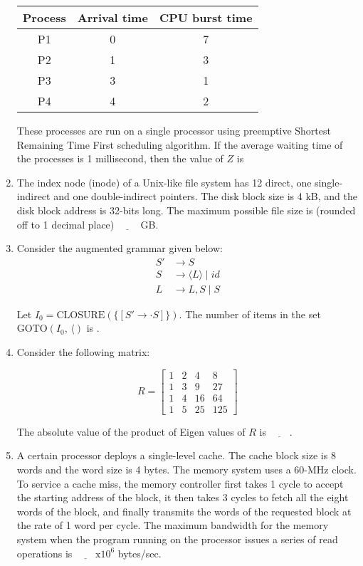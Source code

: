\documentclass[12pt]{article}
\begin{document}
\begin{enumerate}[label=Q.\arabic*]
\begin{center}
\begin{tabular}{|c|c|c|}
\hline
Process & Arrival time & CPU burst time \\
\hline
P1 & 0 & 7 \\
P2 & 1 & 3 \\
P3 & 3 & 1 \\
P4 & 4 & 2 \\
\hline
\end{tabular}
\end{center}

These processes are run on a single processor using preemptive Shortest Remaining Time First scheduling algorithm. If the average waiting time of the processes is 1 millisecond, then the value of $Z$ is \underline{\hspace{2cm}}


\item The index node (inode) of a Unix-like file system has 12 direct, one single-indirect and one double-indirect pointers. The disk block size is 4 kB, and the disk block address is 32-bits long. The maximum possible file size is (rounded off to 1 decimal place) $\underline{\quad\quad}$ GB.

\item Consider the augmented grammar given below:
\begin{align*}
S' &\rightarrow S \\
S &\rightarrow \langle L \rangle \mid id \\
L &\rightarrow L, S \mid S
\end{align*}

Let $I_0 = \text{CLOSURE}(\{[S' \rightarrow \cdot S]\})$. The number of items in the set $\text{GOTO}(I_0,\, \langle)$ is \underline{\quad\quad}.


\item Consider the following matrix:

\[
R = \begin{bmatrix}
1 & 2 & 4 & 8 \\
1 & 3 & 9 & 27 \\
1 & 4 & 16 & 64 \\
1 & 5 & 25 & 125
\end{bmatrix}
\]

The absolute value of the product of Eigen values of $R$ is $\underline{\quad\quad}$.

\item A certain processor deploys a single-level cache. The cache block size is 8 words and the word size is 4 bytes. The memory system uses a 60-MHz clock. To service a cache miss, the memory controller first takes 1 cycle to accept the starting address of the block, it then takes 3 cycles to fetch all the eight words of the block, and finally transmits the words of the requested block at the rate of 1 word per cycle. The maximum bandwidth for the memory system when the program running on the processor issues a series of read operations is $\underline{\quad\quad} \text{x} 10^6$ bytes/sec.


\end{enumerate}
\end{document}
